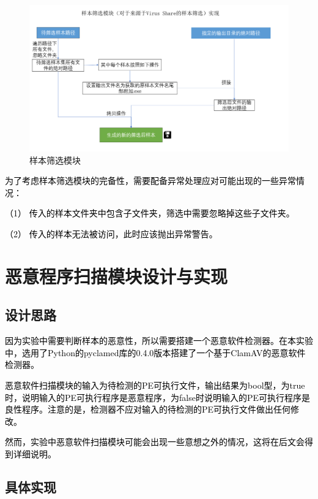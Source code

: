 \begin{figure}[htbp]
  \centering
  \includegraphics[]{images/sample_swift_module.png}
  \caption{样本筛选模块}\label{fig:sample_swift_module}
\end{figure}

\textcolor{black}{为了考虑样本筛选模块的完备性，需要配备异常处理应对可能出现的一些异常情况：}

\textcolor{black}{（1）	传入的样本文件夹中包含子文件夹，筛选中需要忽略掉这些子文件夹。}

\textcolor{black}{（2）	传入的样本无法被访问，此时应该抛出异常警告。}

\section{恶意程序扫描模块设计与实现}

\subsection{设计思路}

\textcolor{black}{因为实验中需要判断样本的恶意性，所以需要搭建一个恶意软件检测器。在本实验中，选用了Python的pyclamed库的0.4.0版本搭建了一个基于ClamAV的恶意软件检测器。}

\textcolor{black}{恶意软件扫描模块的输入为待检测的PE可执行文件，输出结果为bool型，为true时，说明输入的PE可执行程序是恶意程序，为false时说明输入的PE可执行程序是良性程序。注意的是，检测器不应对输入的待检测的PE可执行文件做出任何修改。}

\textcolor{black}{然而，实验中恶意软件扫描模块可能会出现一些意想之外的情况，这将在后文会得到详细说明。}

\subsection{具体实现}

